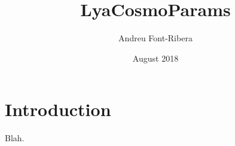 \documentclass{article}
\title{LyaCosmoParams}
\author{Andreu Font-Ribera}
\date{August 2018}
\begin{document}
\maketitle

\section{Introduction}

Blah.
\end{document}
